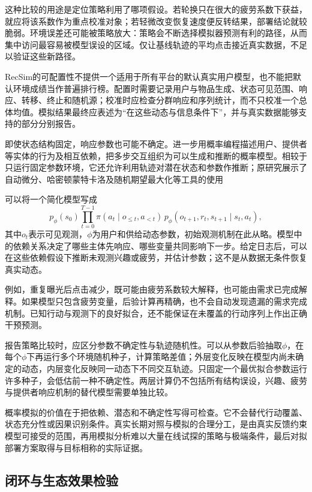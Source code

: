 这种比较的用途是定位策略利用了哪项假设。若轮换只在很大的疲劳系数下获益，就应将该系数作为重点校准对象；若轻微改变恢复速度便反转结果，部署结论就较脆弱。环境误差还可能被策略放大：策略会不断选择模拟器预测有利的路径，从而集中访问最容易被模型误设的区域。仅让基线轨迹的平均点击接近真实数据，不足以验证这些新路径。

RecSim的可配置性不提供一个适用于所有平台的默认真实用户模型，也不能把默认环境成绩当作普遍排行榜。配置时需要记录用户与物品生成、状态可见范围、响应、转移、终止和随机源；校准时应检查分群响应和序列统计，而不只校准一个总体均值。模拟结果最终应表述为“在这些动态与信息条件下”，并与真实数据能够支持的部分分别报告。

\Needspace{100mm}
即使状态结构固定，响应参数也可能不确定。进一步用概率编程描述用户、提供者等实体的行为及相互依赖，把多步交互组织为可以生成和推断的概率模型。相较于只运行固定参数环境，它还允许利用轨迹对潜在状态和参数作推断；原研究展示了自动微分、哈密顿蒙特卡洛及随机期望最大化等工具的使用

可以将一个简化模型写成
\[
 p_\phi(s_0)
 \prod_{t=0}^{T-1}
 \pi(a_t\mid o_{\leq t},a_{<t})\,
 p_\phi(o_{t+1},r_t,s_{t+1}\mid s_t,a_t),
\]
其中$o_t$表示可见观测，$\phi$为用户和供给动态参数，初始观测机制在此从略。模型中的依赖关系决定了哪些主体先响应、哪些变量共同影响下一步。给定日志后，可以在这些依赖假设下推断未观测兴趣或疲劳，并估计参数；这不是从数据无条件恢复真实动态。

例如，重复曝光后点击减少，既可能由疲劳系数较大解释，也可能由需求已完成解释。如果模型只包含疲劳变量，后验计算再精确，也不会自动发现遗漏的需求完成机制。已知行动与观测下的良好拟合，还不能保证在未覆盖的行动序列上作出正确干预预测。

报告策略比较时，应区分参数不确定性与轨迹随机性。可以从参数后验抽取$\phi$，在每个$\phi$下再运行多个环境随机种子，计算策略差值；外层变化反映在模型内尚未确定的动态，内层变化反映同一动态下不同交互轨迹。只固定一个最优拟合参数运行许多种子，会低估前一种不确定性。两层计算仍不包括所有结构误设，兴趣、疲劳与提供者响应机制的替代模型需要单独比较。

概率模拟的价值在于把依赖、潜态和不确定性写得可检查。它不会替代行动覆盖、状态充分性或因果识别条件。真实长期对照与模拟的合理分工，是由真实反馈约束模型可接受的范围，再用模拟分析难以大量在线试探的策略与极端条件，最后对拟部署方案取得与目标相称的实际证据。

\subsection{闭环与生态效果检验}
\label{sec:rs-feedback-ecosystem-evaluation}

